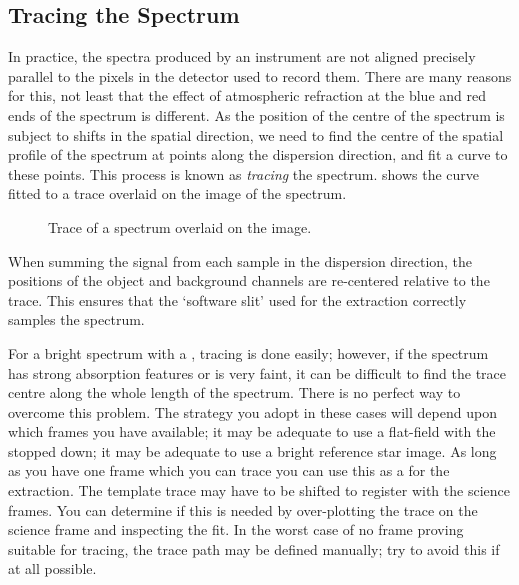 \subsection{Tracing the Spectrum}

In practice, the spectra produced by an instrument are not aligned
precisely parallel to the pixels in the detector used to record them.
There are many reasons for this, not least that the effect of
atmospheric refraction at the blue and red ends of the spectrum is
different.
As the position of the centre of the spectrum is subject to shifts in the
spatial direction, we need to find the centre of the spatial profile of
the spectrum at points along the dispersion direction, and fit
a curve to these points.
This process is known as {\em tracing} the spectrum.
 shows the
curve fitted to a trace overlaid on the image of the spectrum.

\begin{figure}
\begin{center}
{\leavevmode\epsfysize=136mm}

\parbox{140mm}{
\caption{Trace of a spectrum overlaid on the image.}
\label{fi_order_trace}
}
\end{center}
\end{figure}

When summing the signal from each sample in the dispersion direction, the
positions of the object and background channels are re-centered relative to
the trace.  This ensures that the `software slit' used for the extraction
correctly samples the spectrum.

For a bright spectrum with a , tracing is
done easily; however, if the spectrum has strong absorption features or is
very faint, it can be difficult to find the trace centre along the whole
length of the spectrum.
There is no perfect way to overcome this problem.
The strategy you adopt in these cases will depend upon which frames
you have available; it may be adequate to use a flat-field with the
stopped down; it may be adequate to use a bright reference star image.
As long as you have one frame which you can trace you can use this
as a  for the extraction.
The template trace may have to be shifted to register with the science frames.
You can determine if this is needed by over-plotting the trace on
the science frame and inspecting the fit.
In the worst case of no frame proving suitable for tracing, the trace
path may be defined manually; try to avoid this if at all possible.


